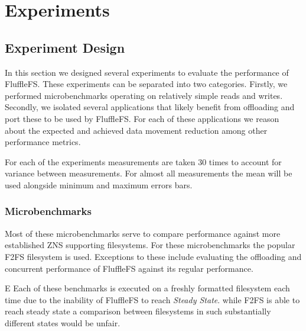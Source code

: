 
\chapter{Experiments} %



\ifpdf
    \graphicspath{{7/figures/PNG/}{7/figures/PDF/}{7/figures/}}
\else
    \graphicspath{{7/figures/EPS/}{7/figures/}}
\fi


% 

\section{Experiment Design}

In this section we designed several experiments to evaluate the performance of
FluffleFS. These experiments can be separated into two categories. Firstly,
we performed microbenchmarks operating on relatively simple reads and writes.
Secondly, we isolated several applications that likely benefit from offloading
and port these to be used by FluffleFS. For each of these applications we reason
about the expected and achieved data movement reduction among other performance
metrics.

For each of the experiments measurements are taken 30 times to account for
variance between measurements. For almost all measurements the mean will
be used alongside minimum and maximum errors bars.

\subsection{Microbenchmarks}

Most of these microbenchmarks serve to compare performance against more
established ZNS supporting filesystems. For these microbenchmarks the popular
F2FS\cite{Lee2015F2FSAN} filesystem is used. Exceptions to these include
evaluating the offloading and concurrent performance of FluffleFS against its
regular performance.

E
Each of these benchmarks is executed on a freshly formatted filesystem each
time due to the inability of FluffleFS to reach \textit{Steady State}. while
F2FS is able to reach steady state a comparison between filesystems in such
substantially different states would be unfair.

